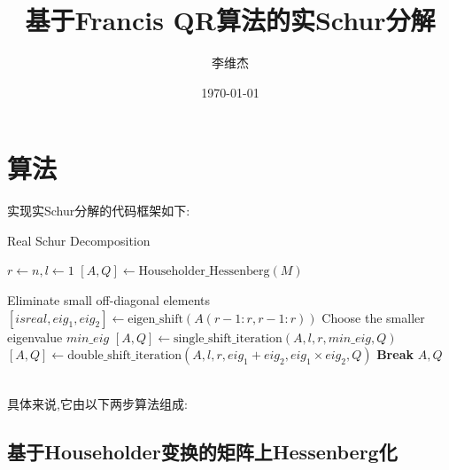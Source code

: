 \documentclass[12pt, a4paper, oneside]{ctexart}
\title{\textbf{基于Francis QR算法的实Schur分解}}
\author{李维杰}
\date{\today}
\begin{document}
\maketitle

\setcounter{page}{0}
\tableofcontents

\newpage
\setcounter{page}{1}

\section{算法}

实现实Schur分解的代码框架如下:
\begin{algorithm}
    \caption{Real Schur Decomposition}
    \begin{algorithmic}[1]
            \State $r \gets n, l \gets 1$
            \State $[A, Q] \gets \text{Householder\_Hessenberg}(M)$ 

                \State Eliminate small off-diagonal elements                
                \State $[isreal, eig_1, eig_2] \gets \text{eigen\_shift}(A(r-1:r, r-1:r))$ 
                    \State Choose the smaller eigenvalue $min\_eig$
                    \State $[A, Q] \gets \text{single\_shift\_iteration}(A, l, r, min\_eig, Q)$ 
                \Else
                        \State $[A, Q] \gets \text{double\_shift\_iteration}(A, l, r, eig_1 + eig_2, eig_1 \times eig_2, Q)$ 
                    \Else
                        \State \textbf{Break} 
                    \EndIf
                \EndIf                
            \EndWhile
            \State \Return $A, Q$ 
        \EndFunction
    \end{algorithmic}
\end{algorithm}\\
具体来说,它由以下两步算法组成:

\subsection{基于Householder变换的矩阵上Hessenberg化}
\end{document}
